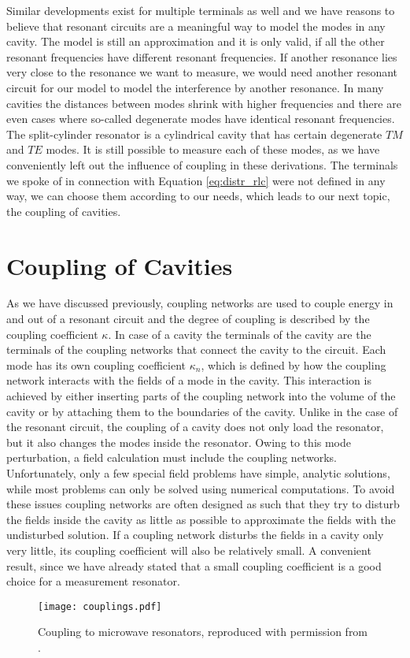 Similar developments exist for multiple terminals as well and we have reasons to believe that resonant circuits are a meaningful way to model the modes in any cavity. The model is still an approximation and it is only valid, if all the other resonant frequencies have different resonant frequencies. If another resonance lies very close to the resonance we want to measure, we would need another resonant circuit for our model to model the interference by another resonance. In many cavities the distances between modes shrink with higher frequencies and there are even cases where so-called degenerate modes have identical resonant frequencies. The split-cylinder resonator is a cylindrical cavity that has certain degenerate $TM$ and $TE$ modes. It is still possible to measure each of these modes, as we have conveniently left out the influence of coupling in these derivations. The terminals we spoke of in connection with Equation \eqref{eq:distr_rlc} were not defined in any way, we can choose them according to our needs, which leads to our next topic, the coupling of cavities.
\section{Coupling of Cavities}\label{sec:cofc}
As we have discussed previously, coupling networks are used to couple energy in and out of a resonant circuit and the degree of coupling is described by the coupling coefficient $\kappa$. In case of a cavity the terminals of the cavity are the terminals of the coupling networks that connect the cavity to the circuit. Each mode has its own coupling coefficient $\kappa_n$, which is defined by how the coupling network interacts with the fields of a mode in the cavity. This interaction is achieved by either inserting parts of the coupling network into the volume of the cavity or by attaching them to the boundaries of the cavity. Unlike in the case of the resonant circuit,  the coupling of a cavity does not only load the resonator, but it also changes the modes inside the resonator. Owing to this mode perturbation, a field calculation must include the coupling networks. Unfortunately, only a few special field problems have simple, analytic solutions, while most problems can only be solved using numerical computations. To avoid these issues coupling networks are often designed as such that they try to disturb the fields inside the cavity as little as possible to approximate the fields with the undisturbed solution. If a coupling network disturbs the fields in a cavity only very little, its coupling coefficient will also be relatively small. A convenient result, since we have already stated that a small coupling coefficient is a good choice for a measurement resonator.
\begin{figure}
  \centering
  \texttt{[image: couplings.pdf]}
  \caption{Coupling to microwave resonators, reproduced with permission from \cite{pozar}.}\label{fig:coupling}
\end{figure}

